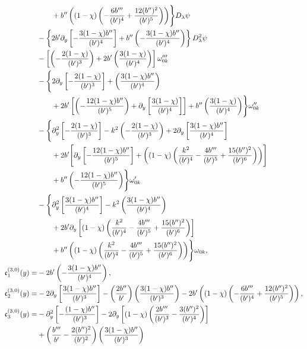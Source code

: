 \documentclass[reqno,11pt]{amsart}
\numberwithin{equation}{section}
\numberwithin{equation}{section} %
\begin{document}
\begin{enumerate}
\begin{align}
 &\qquad+b''\left((1-\chi)\left(-\frac{6b'''}{(b')^4}+\frac{12(b'')^2}{(b')^5}\right)\right)\Biggr\}D_\lambda\psi \notag\\
 &-\left\{2b'\partial_y\left[-\frac{3(1-\chi)b''}{(b')^4}\right]+b''\left(-\frac{3(1-\chi)b''}{(b')^4}\right)\right\}D_\lambda^2\psi \notag\\
 &-\left[\left(-\frac{2(1-\chi)}{(b')^3}\right)+2b'\left(\frac{3(1-\chi)}{(b')^4}\right)\right]\omega_{0k}''' \notag\\
 &-\Biggl\{2\partial_y\left[-\frac{2(1-\chi)}{(b')^3}\right]+\left(\frac{3(1-\chi)b''}{(b')^4}\right) \notag\\
 &\qquad+2b'\left[\left(-\frac{12(1-\chi)b''}{(b')^5}\right)+\partial_y\left[\frac{3(1-\chi)}{(b')^4}\right]\right]+b''\left(\frac{3(1-\chi)}{(b')^4}\right)\Biggr\}\omega_{0k}'' \notag\\
 &-\Biggl\{\partial_y^2\left[-\frac{2(1-\chi)}{(b')^3}\right]-k^2\left(-\frac{2(1-\chi)}{(b')^3}\right)+2\partial_y\left[\frac{3(1-\chi)b''}{(b')^4}\right] \notag\\
 &\qquad+2b'\Biggl[\partial_y\left[-\frac{12(1-\chi)b''}{(b')^5}\right]+\left((1-\chi)\left(\frac{k^2}{(b')^4}-\frac{4b'''}{(b')^5}+\frac{15(b'')^2}{(b')^6}\right)\right)\Biggr] \notag\\
 &\qquad +b''\left(-\frac{12(1-\chi)b''}{(b')^5}\right)\Biggr\}\omega_{0k}' \notag\\
 &-\Biggl\{\partial_y^2\left[\frac{3(1-\chi)b''}{(b')^4}\right]-k^2\left(\frac{3(1-\chi)b''}{(b')^4}\right) \notag\\
 &\qquad+2b'\partial_y\left[(1-\chi)\left(\frac{k^2}{(b')^4}-\frac{4b'''}{(b')^5}+\frac{15(b'')^2}{(b')^6}\right)\right] \notag\\
 &\qquad+b''\left((1-\chi)\left(\frac{k^2}{(b')^4}-\frac{4b'''}{(b')^5}+\frac{15(b'')^2}{(b')^6}\right)\right)\Biggr\}\omega_{0k}, \notag\\
 \mathfrak{c}_1^{(3,0)}(y)=&-2b'\left(-\frac{3(1-\chi)b''}{(b')^4}\right), \notag\\
\mathfrak{c}_2^{(3,0)}(y)=&-2\partial_y\left[\frac{3(1-\chi)b''}{(b')^3}\right]-\left(\frac{2b''}{b'}\right)\left(\frac{3(1-\chi)b''}{(b')^3}\right)-2b'\left((1-\chi)\left(-\frac{6b'''}{(b')^4}+\frac{12(b'')^2}{(b')^5}\right)\right), \notag\\
\mathfrak{c}_3^{(3,0)}(y)=&-\partial_y^2\left[-\frac{(1-\chi)b''}{(b')^3}\right]-2\partial_y\left[(1-\chi)\left(\frac{2b'''}{(b')^3}-\frac{3(b'')^2}{(b')^4}\right)\right] \notag\\
 &+\left(\frac{b'''}{b'}-\frac{2(b'')^2}{(b')^2}\right)\left(\frac{3(1-\chi)b''}{(b')^3}\right) \notag\\

\end{align}
\end{enumerate}
\end{document}
